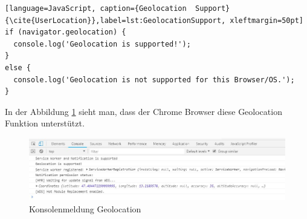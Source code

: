\begin{lstlisting}[language=JavaScript, caption={Geolocation  Support} {\cite{UserLocation}},label=lst:GeolocationSupport, xleftmargin=50pt]
if (navigator.geolocation) {
  console.log('Geolocation is supported!');
}
else {
  console.log('Geolocation is not supported for this Browser/OS.');
}
\end{lstlisting}

In der Abbildung \ref{fig:GeoSupport} sieht man, dass der Chrome Browser diese Geolocation Funktion unterstützt.

\begin{figure}[h]
	\centering
	\includegraphics[width=14cm]{BilderAllgemein/Geolocation/GeoSupport.jpg}\medskip
	\caption{Konsolenmeldung Geolocation}
	\label{fig:GeoSupport}
\end{figure}







